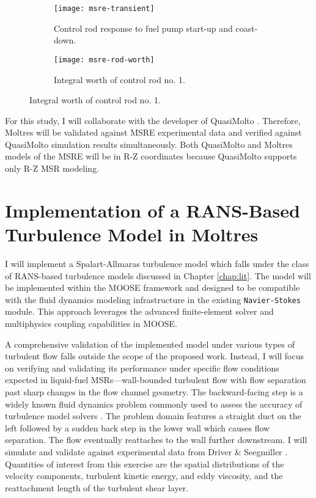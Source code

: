 \begin{figure}[htb!]
  \centering
  \begin{subfigure}[t]{.49\textwidth}
    \centering
    \texttt{[image: msre-transient]}
    \caption{Control rod response to fuel pump start-up and coast-down.}
    \label{fig:msre-trans}
  \end{subfigure}
  \hfill
  \begin{subfigure}[t]{.49\textwidth}
    \centering
    \texttt{[image: msre-rod-worth]}
    \caption{Integral worth of control rod no. 1.}
    \label{fig:msre-rod}
  \end{subfigure}
\end{figure}

For this study, I will collaborate
with the developer of QuasiMolto \cite{reynolds_analysis_2023}. Therefore, Moltres
will be validated against \gls{MSRE} experimental data and verified against QuasiMolto simulation
results simultaneously. Both QuasiMolto and Moltres models of the \gls{MSRE} will be in R-Z
coordinates because QuasiMolto supports only R-Z \gls{MSR} modeling.

\section{Implementation of a RANS-Based Turbulence Model in Moltres}

I will implement a Spalart-Allmaras turbulence model which falls under the class of
\gls{RANS}-based turbulence models discussed in Chapter \ref{chap:lit}. The
model will be implemented within the \gls{MOOSE} framework and
designed to be compatible with the fluid dynamics modeling infrastructure in
the existing \texttt{Navier-Stokes} module. This approach leverages the
advanced finite-element solver and multiphysics coupling capabilities in
\gls{MOOSE}.

A comprehensive validation of the implemented model under various types of
turbulent flow falls outside the scope of the proposed work. Instead, I will
focus on verifying and validating its performance under specific flow conditions expected in
liquid-fuel \glspl{MSR}---wall-bounded turbulent flow with flow separation past
sharp changes in the flow channel geometry. The backward-facing step is a
widely known fluid dynamics problem commonly used to assess the accuracy of
turbulence model solvers \cite{lasher_computation_1992}.
The problem domain features a straight duct
on the left followed by a sudden back step in the lower wall which causes flow
separation. The flow eventually reattaches to the wall further downstream.
I will simulate and validate against experimental data from Driver \&
Seegmiller \cite{driver_features_1985}. Quantities of interest from this
exercise are the spatial distributions of the velocity components, turbulent
kinetic energy, and eddy viscosity, and the reattachment length of the
turbulent shear layer.

